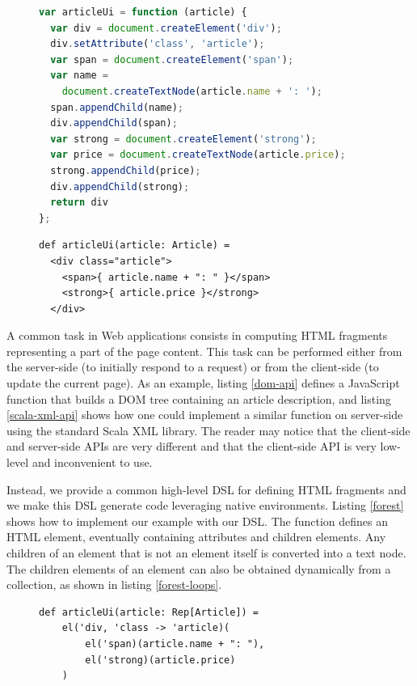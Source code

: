 \documentclass[preprint]{sigplanconf}
\begin{document}
\begin{figure}
\begin{lstlisting}[language=JavaScript,caption=JavaScript DOM API,label=dom-api]
var articleUi = function (article) {
  var div = document.createElement('div');
  div.setAttribute('class', 'article');
  var span = document.createElement('span');
  var name =
    document.createTextNode(article.name + ': ');
  span.appendChild(name);
  div.appendChild(span);
  var strong = document.createElement('strong');
  var price = document.createTextNode(article.price);
  strong.appendChild(price);
  div.appendChild(strong);
  return div
};
\end{lstlisting}
\end{figure}

\begin{figure}
\begin{lstlisting}[caption=Scala XML API,label=scala-xml-api]
def articleUi(article: Article) =
  <div class="article">
    <span>{ article.name + ": " }</span>
    <strong>{ article.price }</strong>
  </div>
\end{lstlisting}
\end{figure}

A common task in Web applications consists in computing HTML fragments representing a part of the page content. This
task can be performed either from the server-side (to initially respond to a request) or from the client-side (to
update the current page). As an example, listing \ref{dom-api} defines a JavaScript function  that
builds a DOM tree containing an article description, and listing \ref{scala-xml-api} shows how one could implement
a similar function on server-side using the standard Scala XML library. The reader may notice that the client-side
and server-side APIs are very different and that the client-side API is very low-level and inconvenient to use.

Instead, we provide a common high-level DSL for defining HTML fragments and we make this DSL generate code leveraging
native environments. Listing \ref{forest} shows how to implement our example with our DSL. The  function
defines an HTML element, eventually containing attributes and children elements. Any children of an element that is
not an element itself is converted into a text node. The children elements of an element can also be obtained
dynamically from a collection, as shown in listing \ref{forest-loops}.

\begin{figure}
\begin{lstlisting}[label=forest,caption=DOM definition DSL]
def articleUi(article: Rep[Article]) =
    el('div, 'class -> 'article)(
        el('span)(article.name + ": "),
        el('strong)(article.price)
    )
\end{lstlisting}
\end{figure}
\end{document}
